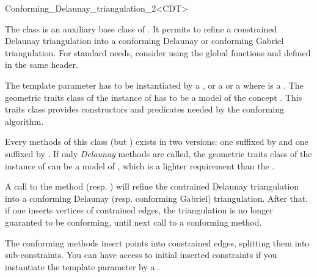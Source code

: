 \begin{ccRefClass}{Conforming_Delaunay_triangulation_2<CDT>}

The class \ccRefName{} is an auxiliary base class of
. It permits to refine a constrained
Delaunay triangulation into a conforming Delaunay or conforming
Gabriel triangulation. For standard needs, consider using the global
fonctions  and
 defined in the same header.

\ccParameters 

The template parameter  has to be instantiated by a
, or a
 or a
 where  is a
. The geometric
traits class of the instance of  has to be a model of the
concept . This traits class
provides constructors and predicates needed by the conforming
algorithm.

Every methods of this class (but ) exists in two
versions: one suffixed by  and one suffixed by
. If only \emph{Delaunay} methods are called, the
geometric traits class of the instance of  can be a model of
, which is a lighter
requirement than the .


A call to the method 
(resp. ) will refine the contrained
Delaunay triangulation into a conforming Delaunay (resp. conforming
Gabriel) triangulation. After that, if one inserts vertices of
contrained edges, the triangulation is no longer guaranted to be
conforming, until next call to a conforming method.

The conforming methods insert points into constrained edges, splitting
them into sub-constraints. You can have access to initial inserted
constraints if you instantiate the template parameter by a
.


\ccInheritsFrom


\ccParameters


\end{ccRefClass}

